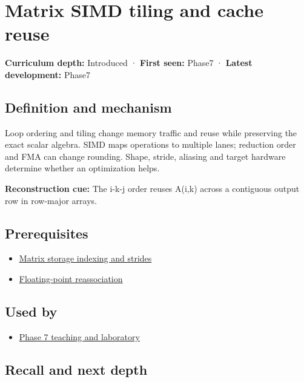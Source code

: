 \hypertarget{appendix-1bfb7c657105}{}
\section{Matrix SIMD tiling and cache reuse}\label{appendix-1bfb7c657105-matrix-simd-tiling-and-cache-reuse}

\textbf{Curriculum depth:} Introduced · \textbf{First seen:} Phase7 · \textbf{Latest development:} Phase7

\subsection{Definition and mechanism}\label{appendix-1bfb7c657105-definition-and-mechanism}

Loop ordering and tiling change memory traffic and reuse while preserving the exact scalar algebra. SIMD maps operations to multiple lanes; reduction order and FMA can change rounding. Shape, stride, aliasing and target hardware determine whether an optimization helps.

\textbf{Reconstruction cue:} The i-k-j order reuses A(i,k) across a contiguous output row in row-major arrays.

\subsection{Prerequisites}\label{appendix-1bfb7c657105-prerequisites}

\begin{itemize}
\tightlist
\item
  \hyperref[appendix-ffdc1d4e5350]{Matrix storage indexing and strides}
\item
  \hyperref[appendix-c2ac4a84c283]{Floating-point reassociation}
\end{itemize}

\subsection{Used by}\label{appendix-1bfb7c657105-used-by}

\begin{itemize}
\tightlist
\item
  \hyperref[01-foundations-i-ch018-keep-the-promises-visible-while-moving-between-representations]{Phase 7 teaching and laboratory}
\end{itemize}

\subsection{Recall and next depth}\label{appendix-1bfb7c657105-recall-and-next-depth}

